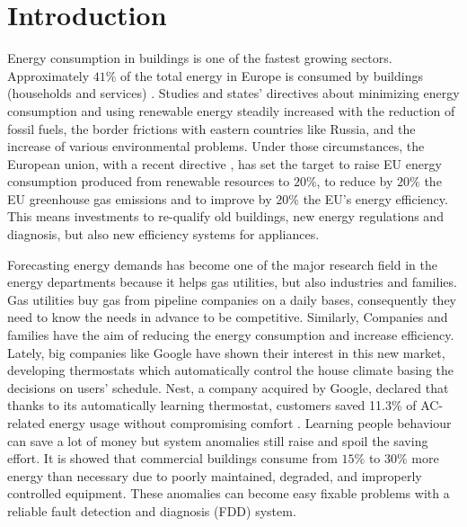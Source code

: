 \documentclass{sig-alternate-sigmod07}
\begin{document}

\section{Introduction}

Energy consumption in buildings is one of the fastest growing sectors. Approximately $41\%$ of the total energy in Europe is consumed by buildings (households and services) \cite{Eurostat2013}. Studies and states' directives about minimizing energy consumption and using renewable energy steadily increased with the reduction of fossil fuels, the border frictions with eastern countries like Russia, and the increase of various environmental problems. Under those circumstances, the European union, with a recent directive \cite{Directive2009}, has set the target to raise EU energy consumption produced from renewable resources to $20\%$, to reduce by $20\%$ the EU greenhouse gas emissions and to improve by $20\%$ the EU's energy efficiency. This means investments to re-qualify old buildings, new energy regulations and diagnosis, but also new efficiency systems for appliances.

Forecasting energy demands has become one of the major research field in the energy departments because it helps gas utilities, but also industries and families. Gas utilities buy gas from pipeline companies on a daily bases, consequently they need to know the needs in advance to be competitive. Similarly, Companies and families have the aim of reducing the energy consumption and increase efficiency. \\
Lately, big companies like Google have shown their interest in this new market, developing thermostats which automatically control the house climate basing the decisions on users' schedule. Nest, a company acquired by Google, declared that thanks to its automatically learning thermostat, customers saved 11.3\% of AC-related energy usage without compromising comfort \cite{GoogleNest2}. Learning people behaviour can save a lot of money but system anomalies still raise and spoil the saving effort. It is showed \cite{katipamula2005review, wu2011cross} that commercial buildings consume from $15\%$ to $30\%$ more energy than necessary due to poorly maintained, degraded, and improperly controlled equipment. These anomalies can become easy fixable problems with a reliable fault detection and diagnosis (FDD) system. 
\end{document}

